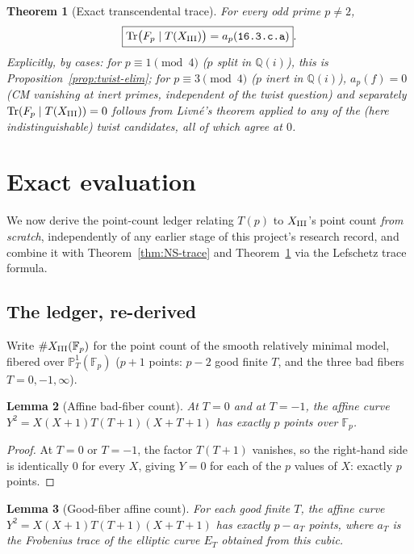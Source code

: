 \documentclass[11pt]{amsart}
\newtheorem{theorem}{Theorem}[section]
\newtheorem{lemma}[theorem]{Lemma}
\theoremstyle{definition}
\newcommand{\Fp}{\mathbb{F}_p}
\newcommand{\Q}{\mathbb{Q}}
\DeclareMathOperator{\Tr}{Tr}
\begin{document}
\begin{theorem}[Exact transcendental trace]
\label{thm:trans-trace}
For every odd prime $p\neq2$,
\[
\boxed{\Tr\bigl(F_p\mid T(X_{\rm III})\bigr) = a_p(\texttt{16.3.c.a})}.
\]
Explicitly, by cases: for $p\equiv1\pmod4$ ($p$ split in $\Q(i)$), this is
Proposition~\ref{prop:twist-elim}; for $p\equiv3\pmod4$ ($p$ inert in
$\Q(i)$), $a_p(f)=0$ (CM vanishing at inert primes, independent of the
twist question) and separately $\Tr(F_p\mid T(X_{\rm III}))=0$ follows
from Livn\'e's theorem applied to any of the (here indistinguishable)
twist candidates, all of which agree at $0$.
\end{theorem}

\section{Exact evaluation}
\label{sec:eval}

We now derive the point-count ledger relating $T(p)$ to $X_{\rm III}$'s
point count \emph{from scratch}, independently of any earlier stage of
this project's research record, and combine it with
Theorem~\ref{thm:NS-trace} and Theorem~\ref{thm:trans-trace} via the
Lefschetz trace formula.

\subsection{The ledger, re-derived}

Write $\#X_{\rm III}(\Fp)$ for the point count of the smooth relatively
minimal model, fibered over $\mathbb{P}^1_T(\Fp)$ ($p+1$ points: $p-2$ good
finite $T$, and the three bad fibers $T=0,-1,\infty$).

\begin{lemma}[Affine bad-fiber count]
\label{lem:bad-affine}
At $T=0$ and at $T=-1$, the affine curve $Y^2=X(X+1)T(T+1)(X+T+1)$ has
exactly $p$ points over $\Fp$.
\end{lemma}

\begin{proof}
At $T=0$ or $T=-1$, the factor $T(T+1)$ vanishes, so the right-hand side
is identically $0$ for every $X$, giving $Y=0$ for each of the $p$ values
of $X$: exactly $p$ points.
\end{proof}

\begin{lemma}[Good-fiber affine count]
\label{lem:good-affine}
For each good finite $T$, the affine curve $Y^2=X(X+1)T(T+1)(X+T+1)$ has
exactly $p-a_T$ points, where $a_T$ is the Frobenius trace of the
elliptic curve $E_T$ obtained from this cubic.
\end{lemma}
\end{document}
